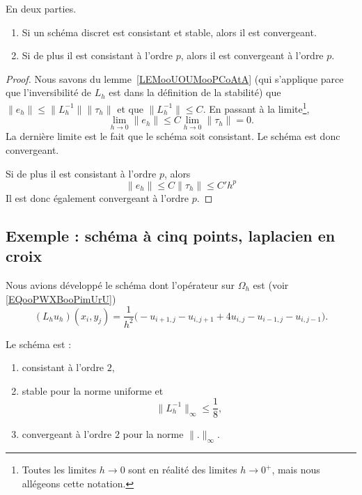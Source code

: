 \begin{theorem}     \label{THOooEPQQooUQMcgF}
	En deux parties.
	\begin{enumerate}
		\item
		      Si un schéma discret est consistant et stable, alors il est convergeant.
		\item
		      Si de plus il est consistant à l'ordre \( p\), alors il est convergeant à l'ordre \( p\).
	\end{enumerate}
\end{theorem}

\begin{proof}
	Nous savons du lemme~\ref{LEMooUOUMooPCoAtA} (qui s'applique parce que l'inversibilité de \( L_h\) est dans la définition de la stabilité) que  \( \| e_h \|\leq \| L_h^{-1} \| \| \tau_h \|\) et que  \( \| L_h^{-1} \|\leq C  \). En passant à la limite\footnote{Toutes les limites \( h\to 0\) sont en réalité des limites \( h\to 0^+\), mais nous allégeons cette notation.},
	\begin{equation}
		\lim_{h\to 0} \| e_h \|\leq C\lim_{h\to 0} \| \tau_h \|=0.
	\end{equation}
	La dernière limite est le fait que le schéma soit consistant. Le schéma est donc convergeant.

	Si de plus il est consistant à l'ordre \( p\), alors
	\begin{equation}
		\| e_h \|\leq C\| \tau_h \|\leq C'h^p
	\end{equation}
	Il est donc également convergeant à l'ordre \( p\).
\end{proof}

\subsection{Exemple : schéma à cinq points, laplacien en croix}

Nous avions développé le schéma dont l'opérateur sur \( \Omega_h\) est (voir \eqref{EQooPWXBooPimUrU})
\begin{equation}
	(L_hu_h)(x_i,y_j)=\frac{1}{ h^2 }\big( -u_{i+1,j}-u_{i,j+1} +4u_{i,j}-u_{i-1,j}-u_{i,j-1}  \big).
\end{equation}

\begin{proposition}
	Le schéma est :
	\begin{enumerate}
		\item
		      consistant à l'ordre \( 2\),
		\item
		      stable pour la norme uniforme et
		      \begin{equation}
			      \| L_h^{-1} \|_{\infty}\leq \frac{1}{ 8 },
		      \end{equation}
		\item
		      convergeant à l'ordre \( 2\) pour la norme \( \| . \|_{\infty}\).
	\end{enumerate}
\end{proposition}

